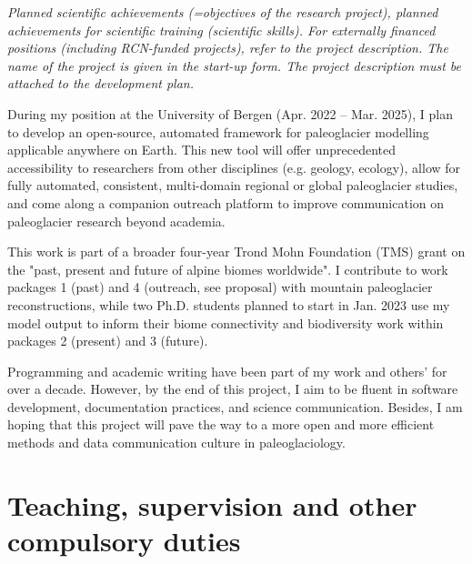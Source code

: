 \documentclass{article}
\newcommand{\guideline}[1]{{\color{color2}\itshape{#1}}}
\begin{document}
    \guideline{
        Planned scientific achievements (=objectives of the research project),
        planned achievements for scientific training (scientific skills). For
        externally financed positions (including RCN-funded projects), refer to
        the project description. The name of the project is given in the
        start-up form.  The project description must be attached to the
        development plan.}

    During my position at the University of Bergen (Apr. 2022 -- Mar. 2025), I
    plan to develop an open-source, automated framework for paleoglacier
    modelling applicable anywhere on Earth. This new tool will offer
    unprecedented accessibility to researchers from other disciplines (e.g.
    geology, ecology), allow for fully automated, consistent, multi-domain
    regional or global paleoglacier studies, and come along a companion
    outreach platform to improve communication on paleoglacier research beyond
    academia.

    This work is part of a broader four-year Trond Mohn Foundation (TMS) grant
    on the "past, present and future of alpine biomes worldwide". I contribute
    to work packages 1 (past) and 4 (outreach, see proposal) with mountain
    paleoglacier reconstructions, while two Ph.D. students planned to start in
    Jan. 2023 use my model output to inform their biome connectivity and
    biodiversity work within packages 2 (present) and 3 (future).

    Programming and academic writing have been part of my work and others' for
    over a decade. However, by the end of this project, I aim to be fluent in
    software development, documentation practices, and science communication.
    Besides, I am hoping that this project will pave the way to a more open and
    more efficient methods and data communication culture in paleoglaciology.


\section{Teaching, supervision and other compulsory duties}
\end{document}
